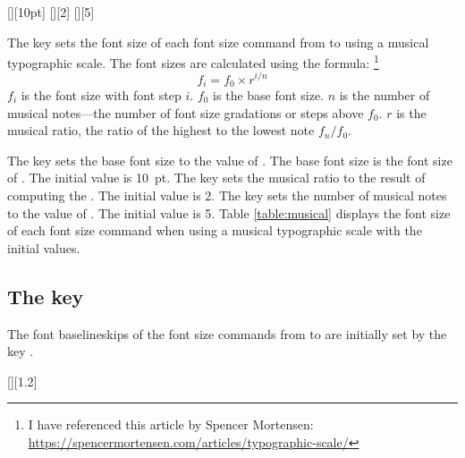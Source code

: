 \documentclass{beery}
\begin{document}


\begin{displaycode}
  [][10pt]%
  \nopagebreak\newline
  [][2]%
  \nopagebreak\newline
  [][5]
\end{displaycode}

The key  sets the font size of each font size command from  to  using a musical typographic scale.
The font sizes are calculated using the formula:%
\footnote
  {
    I have referenced this article by Spencer Mortensen:
    \newline
    \url{https://spencermortensen.com/articles/typographic-scale/}
  }
\begin{equation}\label{eq:musical}
  f_i = f_0 \times r ^ { i / n }
\end{equation}
$f_i$ is the font size with font step $i$.
$f_0$ is the base font size.
$n$ is the number of musical notes---the number of font size gradations or steps above $f_0$.
$r$ is the musical ratio, the ratio of the highest to the lowest note $ f_n / f_0 $.

The key  sets the base font size to the value of .
The base font size is the font size of .
The initial value is \qty{10}{pt}.
The key  sets the musical ratio to the result of computing the .
The initial value is \num{2}.
The key  sets the number of musical notes to the value of .
The initial value is \num{5}.
Table \ref{table:musical} displays the font size of each font size command when using a musical typographic scale with the initial values.



\subsection{The key }
\label{subsec:baselineskipsizeratio}

The font baselineskips of the font size commands from  to  are initially set by the key .

\begin{displaycode}
  [][1.2]
\end{displaycode}
\end{document}

